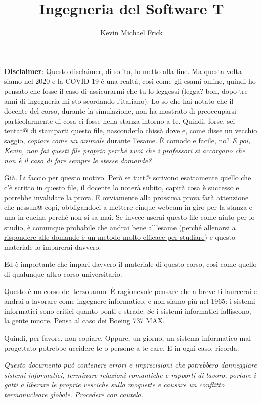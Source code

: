 \documentclass[answers, a4paper, 11pt]{exam}
\title{Ingegneria del Software T}
\author{Kevin Michael Frick}
\begin{document}
\maketitle
\textbf{Disclaimer}:  Questo disclaimer, di solito, lo metto alla fine. 
Ma questa volta siamo nel 2020 e la COVID-19 è una realtà, così come gli esami online, quindi ho pensato che fosse il caso di assicurarmi che tu lo leggessi (legga? boh, dopo tre anni di ingegneria mi sto scordando l'italiano).
Lo so che hai notato che il docente del corso, durante la simulazione, non ha mostrato di preoccuparsi particolarmente di cosa ci fosse nella stanza intorno a te.
Quindi, forse, sei tentat@ di stamparti questo file, nasconderlo chissà dove e, come disse un vecchio saggio, \textit{copiare come un animale} durante l'esame. 
È comodo e facile, no? 
\textit{E poi, Kevin, non fai questi file proprio perché vuoi che i professori si accorgano che non è il caso di fare sempre le stesse domande?}

Già. 
Li faccio per questo motivo. 
Però se tutt@ scrivono esattamente quello che c'è scritto in questo file, il docente lo noterà subito, capirà cosa è successo e potrebbe invalidare la prova. 
E ovviamente alla prossima prova farà attenzione che nessun@ copi, obbligandoci a mettere cinque webcam in giro per la stanza e una in cucina perché non si sa mai. 
Se invece userai questo file come aiuto per lo studio, è comunque probabile che andrai bene all'esame (perché \href{https://www.ernweb.com/educational-research-articles/learning-techniques-effective-study/}{allenarsi a rispondere alle domande è un metodo molto efficace per studiare}) e questo materiale lo imparerai davvero.

Ed è importante che impari davvero il materiale di questo corso, così come quello di qualunque altro corso universitario. 

Questo è un corso del terzo anno. 
È ragionevole pensare che a breve ti laureerai e andrai a lavorare come ingegnere informatico, e non siamo più nel 1965: i sistemi informatici sono critici quanto ponti e strade.
Se i sistemi informatici falliscono, la gente muore.
\href{https://en.wikipedia.org/wiki/Boeing_737_MAX_groundings}{Pensa al caso dei Boeing 737 MAX.}

Quindi, per favore, non copiare.
Oppure, un giorno, un sistema informatico mal progettato potrebbe uccidere te o persone a te care.
E in ogni caso, ricorda:

\textit{Questo documento può contenere errori e imprecisioni che potrebbero danneggiare sistemi informatici, terminare relazioni romantiche e rapporti di lavoro, portare i gatti a liberare le proprie vesciche sulla moquette e causare un conflitto termonucleare globale.
Procedere con cautela.}
\end{document}
